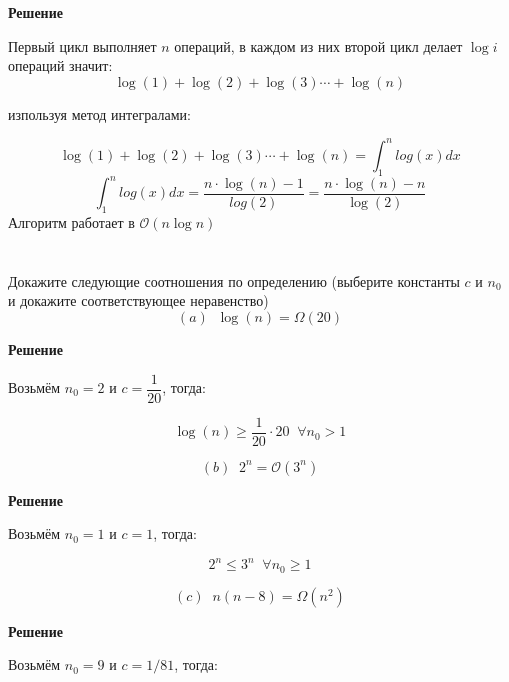 \documentclass{article}
\begin{document}
\textbf{Решение}

Первый цикл выполняет $n$ операций, 
 в каждом из них второй цикл делает $\log i$ операций значит:
\begin{equation*}
    \log (1) + \log (2) + \log (3) \cdots + \log (n)
\end{equation*}

изпользуя метод интегралами:

\begin{equation*}
    \log (1) + \log (2) + \log (3) \cdots + \log (n) = \int_{1}^{n} log(x) dx
\end{equation*}
\begin{equation*}
    \int_{1}^{n} log(x) dx = \dfrac{n \cdot \log (n) - 1}{log(2)} = \dfrac{n\cdot \log (n) - n}{\log (2)}
\end{equation*}
Алгоритм работает в $\mathcal{O}(n \log n)$

\bigskip
\bigskip
\section{}
Докажите следующие соотношения по определению (выберите константы $c$ и $n_0$ и докажите соответствующее неравенство)
\begin{equation*}
    (a) \;\; \log (n) = \Omega(20)
\end{equation*}

\textbf{Решение}

Возьмём $n_0 = 2$ и $c = \dfrac{1}{20}$, тогда:

\begin{equation*}
    \log (n) \geq \dfrac{1}{20}\cdot 20 \; \; \forall n_0 > 1
\end{equation*}

\newpage
\begin{equation*}
    (b) \;\; 2^{n} = \mathcal{O}(3^n)
\end{equation*}

\textbf{Решение}

Возьмём $n_0 = 1$ и $c = 1$, тогда:

\begin{equation*}
    2^n \leq 3^n \; \; \forall n_0 \geq 1
\end{equation*}

\bigskip
\bigskip
\begin{equation*}
    (c) \;\; n(n - 8) = \Omega(n^2)
\end{equation*}

\textbf{Решение}

Возьмём $n_0 = 9$ и $c = 1/81$, тогда:
\end{document}
